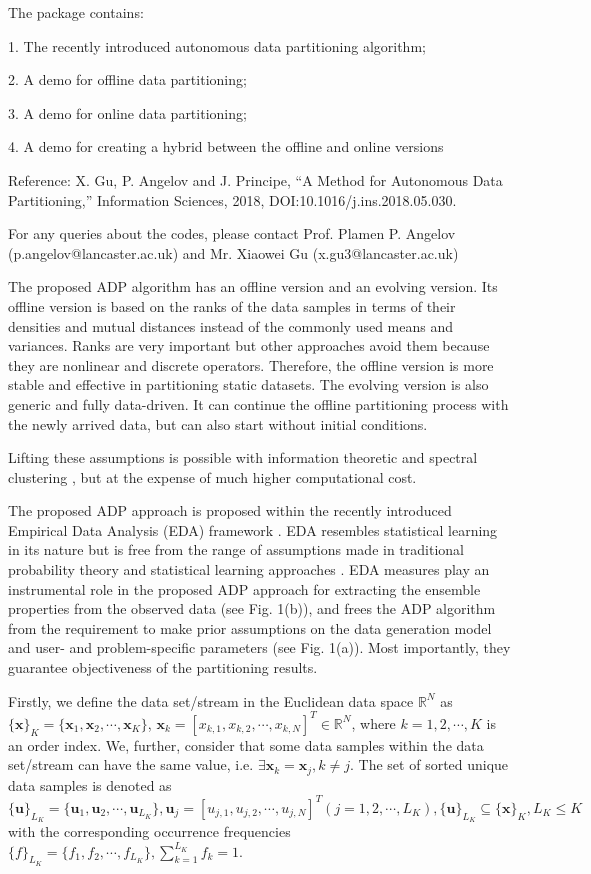 The package contains:

1. The recently introduced autonomous data partitioning algorithm;

2. A demo for offline data partitioning;

3. A demo for online data partitioning;

4. A demo for creating a hybrid between the offline and online versions

Reference: X. Gu, P. Angelov and J. Principe, “A Method for Autonomous Data Partitioning,” Information Sciences, 2018, DOI:10.1016/j.ins.2018.05.030.

For any queries about the codes, please contact Prof. Plamen P. Angelov (p.angelov@lancaster.ac.uk) and Mr. Xiaowei Gu (x.gu3@lancaster.ac.uk)

The proposed ADP algorithm has an offline version and an evolving version. Its offline version is based on the ranks of the data samples in terms of their densities and mutual distances instead of the commonly used means and variances. Ranks are very important but other approaches avoid them because they are nonlinear and discrete operators. Therefore,
the offline version is more stable and effective in partitioning static datasets. The evolving version is also generic and fully
data-driven. It can continue the offline partitioning process with the newly arrived data, but can also start without initial
conditions.

Lifting these assumptions is possible with information theoretic \cite{JenssenErdogmus2007-5673} and spectral clustering \cite{vonLuxburg2007-5674}, but at the expense of much higher computational cost.

The proposed ADP approach is proposed within the recently introduced Empirical Data Analysis (EDA) framework \cite{Angelov2014Outside,Angelov2016-7844219,Angelov2017Empirical}.
EDA resembles statistical learning in its nature but is free from the range of assumptions made in traditional probability theory and statistical learning approaches \cite{Angelov2014Outside,Angelov2016-7844219,Angelov2017Empirical}. EDA measures play an instrumental role in the proposed ADP approach for extracting the ensemble properties from the observed data (see Fig. 1(b)), and frees the ADP algorithm from the requirement to make prior assumptions on the data generation model and user- and problem-specific parameters (see Fig. 1(a)). Most importantly, they guarantee objectiveness of the partitioning results.

Firstly, we define the data set/stream in the Euclidean data space $\mathbb R^N$ as $\{\bm x\}_K = \{\bm x_1, \bm x_2, \cdots, \bm x_K\}$, $\bm x_k =[x_{k, 1}, x_{k, 2}, \cdots, x_{k, N}]^T \in \mathbb R^N$, where $k = 1, 2, \cdots, K$ is an order index. We, further, consider that some data samples within the data set/stream can have the same value, i.e. $\exists \bm x_k = \bm x_j, k\neq j$. The set of sorted unique data samples is denoted as $\{\bm u\}_{L_K} =\{\bm u_1, \bm u_2, \cdots, \bm u_{L_K}\},\bm u_j = [u_{j,1}, u_{j,2}, \cdots, u_{j,N}]^T ( j = 1, 2, \cdots, L_K), \{\bm u\}_{L_K} \subseteq \{\bm x\}_K , L_K \leq K$ with the corresponding occurrence frequencies
$\{f\}_{L_K} = \{ f_1, f_2, \cdots, f_{L_K}\},\sum\limits^{L_K}_{k=1} f_k = 1$.

